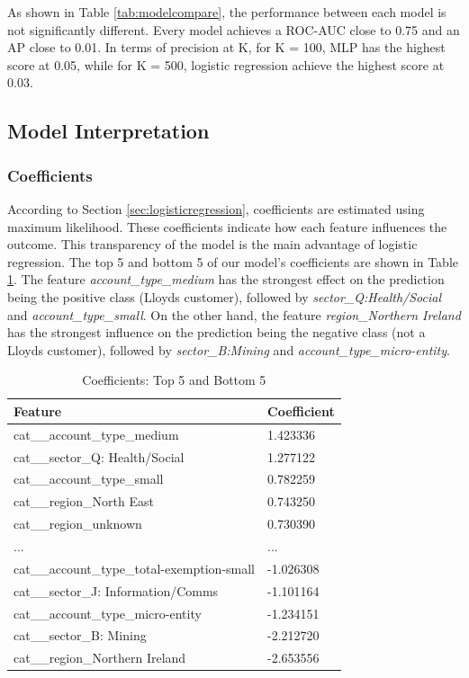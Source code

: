 \documentclass[ %
                    author={Natchalin Iwsakul \\[0.4em] Inkaphol Siriwongwattana \\[0.4em] Tanaphan Kummaraphat \\[0.6em] Patorn Srisupap},,
                supervisor={Fernando Moreno-Pino},
                    degree={MSc},
                     title={Propensity Modelling for SME Commercial Lending Using Open Public Data
},
                  subtitle={Companies House and GDELT as predictors of first-time borrowing},
                      type={},
                      year={2026}]{dissertation}
\begin{document}
As shown in Table \ref{tab:modelcompare}, the performance between each model is not significantly different. Every model achieves a ROC-AUC close to 0.75 and an AP close to 0.01. In terms of precision at K, for K = 100, MLP has the highest score at 0.05, while for K = 500, logistic regression achieve the highest score at 0.03. 


\subsection{Model Interpretation}
\subsubsection{Coefficients}
According to Section \ref{sec:logisticregression}, coefficients are estimated using maximum likelihood. These coefficients indicate how each feature influences the outcome. This transparency of the model is the main advantage of logistic regression. The top 5 and bottom 5 of our model's coefficients are shown in Table \ref{tab:coefficients}. The feature \textit{account\_type\_medium} has the strongest effect on the prediction being the positive class (Lloyds customer), followed by \textit{sector\_Q:Health/Social} and \textit{account\_type\_small}. On the other hand, the feature \textit{region\_Northern Ireland} has the strongest influence on the prediction being the negative class (not a Lloyds customer), followed by \textit{sector\_B:Mining} and \textit{account\_type\_micro-entity}.

\begin{table}[h]
    \centering
    \begin{tabular}{ll}
    \toprule
        Feature & Coefficient \\
        \midrule
        cat\_\_account\_type\_medium & 1.423336 \\
        cat\_\_sector\_Q: Health/Social & 1.277122 \\
        cat\_\_account\_type\_small & 0.782259 \\
        cat\_\_region\_North East & 0.743250 \\
        cat\_\_region\_unknown & 0.730390 \\
        ... & ... \\
        cat\_\_account\_type\_total-exemption-small & -1.026308 \\
        cat\_\_sector\_J: Information/Comms & -1.101164 \\
        cat\_\_account\_type\_micro-entity & -1.234151 \\
        cat\_\_sector\_B: Mining & -2.212720 \\
        cat\_\_region\_Northern Ireland & -2.653556 \\
        \bottomrule
    \end{tabular}
    \caption{Coefficients: Top 5 and Bottom 5}
    \label{tab:coefficients}
\end{table}
\end{document}
